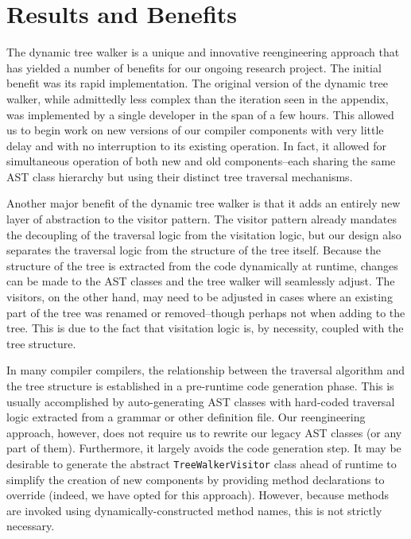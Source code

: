 \documentclass[times]{speauth}
\begin{document}

\section{Results and Benefits}

The dynamic tree walker is a unique and innovative reengineering approach that has yielded a number of benefits for our ongoing research project. The initial benefit was its rapid implementation. The original version of the dynamic tree walker, while admittedly less complex than the iteration seen in the appendix, was implemented by a single developer in the span of a few hours. This allowed us to begin work on new versions of our compiler components with very little delay and with no interruption to its existing operation. In fact, it allowed for simultaneous operation of both new and old components--each sharing the same AST class hierarchy but using their distinct tree traversal mechanisms.

Another major benefit of the dynamic tree walker is that it adds an entirely new layer of abstraction to the visitor pattern. The visitor pattern already mandates the decoupling of the traversal logic from the visitation logic, but our design also separates the traversal logic from the structure of the tree itself. Because the structure of the tree is extracted from the code dynamically at runtime, changes can be made to the AST classes and the tree walker will seamlessly adjust. The visitors, on the other hand, may need to be adjusted in cases where an existing part of the tree was renamed or removed--though perhaps not when adding to the tree. This is due to the fact that visitation logic is, by necessity, coupled with the tree structure.

In many compiler compilers, the relationship between the traversal algorithm and the tree structure is established in a pre-runtime code generation phase. This is usually accomplished by auto-generating AST classes with hard-coded traversal logic extracted from a grammar or other definition file. Our reengineering approach, however, does not require us to rewrite our legacy AST classes (or any part of them). Furthermore, it largely avoids the code generation step. It may be desirable to generate the abstract \texttt{TreeWalkerVisitor} class ahead of runtime to simplify the creation of new components by providing method declarations to override (indeed, we have opted for this approach). However, because methods are invoked using dynamically-constructed method names, this is not strictly necessary.
\end{document}
